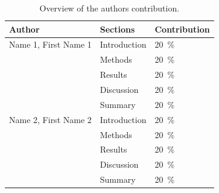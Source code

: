 
\begin{table}[H]
    \centering
    \renewcommand{\arraystretch}{1.2}
    \caption{Overview of the authors contribution.}
    \begin{tabular}{p{} p{} p{}}
        \toprule
        \textbf{Author} & \textbf{Sections} & \textbf{Contribution} \\
        \midrule
        Name 1, First Name 1 & Introduction & \qty{20}{\percent} \\
        & Methods & \qty{20}{\percent} \\
        & Results & \qty{20}{\percent} \\
        & Discussion & \qty{20}{\percent} \\
        & Summary & \qty{20}{\percent} \\
        \addlinespace
        Name 2, First Name 2 & Introduction & \qty{20}{\percent} \\
        & Methods & \qty{20}{\percent} \\
        & Results & \qty{20}{\percent} \\
        & Discussion & \qty{20}{\percent} \\
        & Summary & \qty{20}{\percent} \\

        \bottomrule
    \end{tabular}
\end{table}